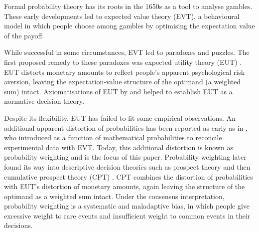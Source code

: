 \documentclass[a4paper, 12pt]{article}
\newcommand{\ie}{\textit{i.e.}\xspace}
\begin{document}
Formal probability theory has its roots in the 1650s as a tool to analyse gambles. These early developments led to expected value theory (EVT), a behavioural model in which people choose among gambles by optimising the expectation value of the payoff.


While successful in some circumstances, EVT led to paradoxes and puzzles. The first proposed remedy to these paradoxes was expected utility theory (EUT) \parencite{Bernoulli1738,Laplace1814}.
EUT distorts monetary amounts to reflect people's apparent psychological risk aversion, leaving the expectation-value structure of the optimand (a weighted sum) intact.
Axiomatisations of EUT by \textcite{vonNeumannMorgenstern1944} and \textcite{Savage1954} helped to establish EUT as a normative decision theory.

Despite its flexibility, EUT has failed to fit some empirical observations.
An additional apparent distortion of probabilities has been reported as early as in \textcite[Fig. 1, p. 188]{PrestonBaratta1948}, who introduced  as a function of mathematical probabilities to reconcile experimental data with EVT.
Today, this additional distortion is known as probability weighting and is the focus of this paper.
Probability weighting later found its way into descriptive decision theories such as prospect theory \parencite{KahnemanTversky1979} and then cumulative prospect theory (CPT) \parencite{TverskyKahneman1992}.
CPT combines the distortion of probabilities with EUT's distortion of monetary amounts, again leaving the structure of the optimand as a weighted sum intact.
Under the consensus interpretation, probability weighting is a systematic and maladaptive bias, in which people give excessive weight to rare events and insufficient weight to common events in their decisions.
\end{document}
